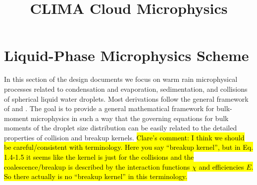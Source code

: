 \documentclass{report}
\title{CLIMA Cloud Microphysics}
\author{ }
\begin{document}
\maketitle
\tableofcontents

\chapter{Liquid-Phase Microphysics Scheme}
In this section of the design documents we focus on warm rain microphysical processes related to condensation and evaporation, sedimentation, and collisions of spherical liquid water droplets. Most derivations follow the general framework of \citep{Beheng01} and \citep{Beheng10}. The goal is to provide a general mathematical framework for bulk-moment microphysics in such a way that the governing equations for bulk moments of the droplet size distribution can be easily related to the detailed properties of collision and breakup kernels. \hl{Clare's comment: I think we should be careful/consistent with terminology. Here you say ``breakup kernel'', but in Eq. 1.4-1.5 it seems like the kernel is just for the collisions and the coalescence/breakup is described by the interaction functions $\chi$ and efficiencies $E$. So there actually is no ``breakup kernel'' in this terminology.}
\end{document}
